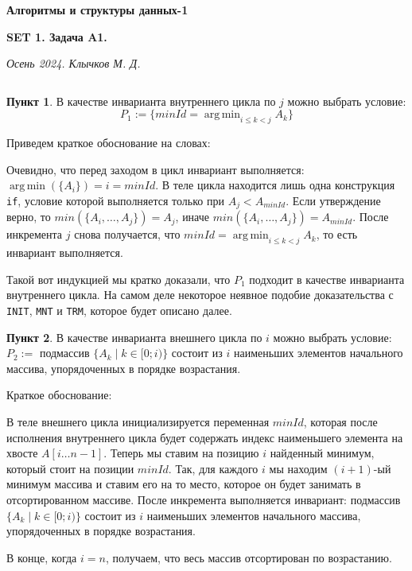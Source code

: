 \documentclass[11pt,a4paper]{scrarticle}
\author{Клычков Максим Дмитриевич}
\theoremstyle{definition}
\newtheorem{subtask}{Пункт}
\DeclareMathOperator*{\argmin}{arg\,min}
\begin{document}
\centerline{\textbf{\huge Алгоритмы и структуры данных-1}}
\centerline{\textbf{SET 1. Задача A1.}}
\begin{flushright}
\emph{Осень 2024. Клычков М. Д.}
\end{flushright}

\begin{figure}[htp]
	\centering
	\inputminted[linenos]{cpp}{selection_sort.cpp}
\end{figure}

\begin{subtask}
	В качестве инварианта внутреннего цикла по $j$ можно выбрать условие:
	$$P_{1} := \{minId = \argmin_{i \le k < j} A_k\}$$
	
	Приведем краткое обоснование на словах:
	
	Очевидно, что перед заходом в цикл инвариант выполняется: $\argmin (\{A_i\}) = i = minId$. В теле цикла находится лишь одна конструкция \texttt{if}, условие которой выполняется только при $A_{j} < A_{minId}$. Если утверждение верно, то $min(\{A_i, \dots, A_j\}) = A_{j}$, иначе $min(\{A_i, \dots, A_j\}) = A_{minId}$. После инкремента $j$ снова получается, что $\displaystyle minId = \argmin_{i \le k < j} A_k$, то есть инвариант выполняется.
	
	Такой вот индукцией мы кратко доказали, что $P_1$ подходит в качестве инварианта внутреннего цикла. На самом деле некоторое неявное подобие доказательства с \texttt{INIT}, \texttt{MNT} и \texttt{TRM}, которое будет описано далее.
\end{subtask}

\begin{subtask}
	В качестве инварианта внешнего цикла по $i$ можно выбрать условие: \\
	$P_2 :=$ подмассив $\{A_k \mid k \in [0; i)\}$ состоит из $i$ наименьших элементов начального массива, упорядоченных в порядке возрастания.
	
	Краткое обоснование:
	
	В теле внешнего цикла инициализируется переменная $minId$, которая после исполнения внутреннего цикла будет содержать индекс наименьшего элемента на хвосте $A[i \dots n - 1]$. Теперь мы ставим на позицию $i$ найденный минимум, который стоит на позиции $minId$. Так, для каждого $i$ мы находим $(i + 1)$-ый минимум массива и ставим его на то место, которое он будет занимать в отсортированном массиве. После инкремента выполняется инвариант: подмассив $\{A_k \mid k \in [0; i)\}$ состоит из $i$ наименьших элементов начального массива, упорядоченных в порядке возрастания.
	
	В конце, когда $i = n$, получаем, что весь массив отсортирован по возрастанию.  
\end{subtask}
\end{document}

